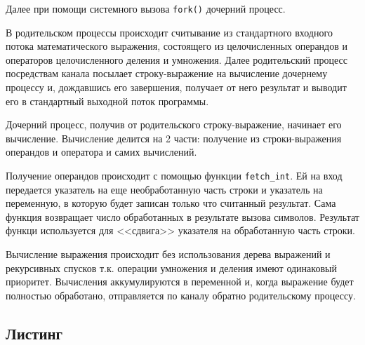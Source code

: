 \documentclass[12pt]{article}
\begin{document}
Далее при помощи системного вызова  \verb|fork()| дочерний процесс.

В родительском процессы происходит считывание из стандартного входного потока математического выражения, состоящего из целочисленных операндов и операторов целочисленного деления и умножения. Далее родительский процесс посредствам канала посылает строку-выражение на вычисление дочернему процессу и, дождавшись его завершения, получает от него результат и выводит его в стандартный выходной поток программы. 

Дочерний процесс, получив от родительского строку-выражение, начинает его вычисление. Вычисление делится на 2 части: получение из строки-выражения операндов и оператора и самих вычислений.

Получение операндов происходит с помощью функции \verb|fetch_int|. Ей на вход передается указатель на еще необработанную часть строки и указатель на переменную, в которую будет записан только что считанный результат. Сама функция возвращает число обработанных в результате вызова символов. Результат функци используется для <<сдвига>> указателя на обработанную часть строки.

Вычисление выражения происходит без использования дерева выражений и рекурсивных спусков т.к. операции умножения и деления имеют одинаковый приоритет. Вычисления аккумулируются в переменной и, когда выражение будет полностью обработано, отправляется по каналу обратно родительскому процессу.

\subsection*{Листинг}
\end{document}
